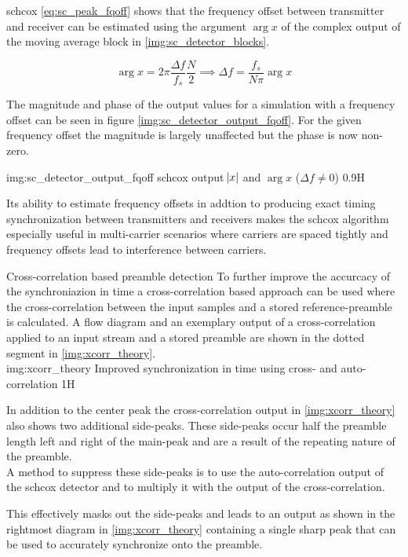 \begin{subchapter}{\acrlong{schcox}}
  \autoref{eq:sc_peak_fqoff} shows that the frequency offset between transmitter
  and receiver can be estimated using the argument $\arg{x}$ of the complex output of the
  moving average block in \autoref{img:sc_detector_blocks}.

  \begin{equation*}
    \arg{x} = 2 \pi \frac{\Delta f}{f_s} \frac{N}{2} \implies \Delta f = \frac{f_s}{N \pi} \arg{x}
  \end{equation*}

  The magnitude and phase of the output values for a simulation with a
  frequency offset can be seen in figure \ref{img:sc_detector_output_fqoff}.
  For the given frequency offset the magnitude is largely unaffected but
  the phase is now non-zero.

               {img:sc_detector_output_fqoff}
               {\acrshort{schcox} output $\abs{x}$ and $\arg{x}$ ($\Delta f \neq 0$)}
               {0.9}{H}
\end{subchapter}

Its ability to estimate frequency offsets in addtion to producing
exact timing synchronization between transmitters and
receivers makes the \acrshort{schcox} algorithm especially useful
in multi-carrier scenarios where carriers are spaced tightly and
frequency offsets lead to interference between carriers.

\begin{subchapter}{Cross-correlation based preamble detection}
  To further improve the accurcacy of the synchroniazion in time
  a cross-correlation based approach can be used where the cross-correlation
  between the input samples and a stored reference-preamble is
  calculated.
  A flow diagram and an exemplary output of a cross-correlation
  applied to an input stream and a stored preamble are shown
  in the dotted segment in \autoref{img:xcorr_theory}. \\

               {img:xcorr_theory}
               {Improved synchronization in time using cross- and auto-correlation}
               {1}{H}

  In addition to the center peak the cross-correlation output
  in \autoref{img:xcorr_theory} also shows two additional side-peaks.
  These side-peaks occur half the preamble length left and right
  of the main-peak and are a result of the repeating nature of
  the preamble. \\

  A method to suppress these side-peaks is to use the auto-correlation
  output of the \gls{schcox} detector and to multiply it with the
  output of the cross-correlation\cite{awoseyila}.

  This effectively masks out the side-peaks and leads to an output as
  shown in the rightmost diagram in \autoref{img:xcorr_theory} containing
  a single sharp peak that can be used to accurately synchronize
  onto the preamble.
\end{subchapter}

